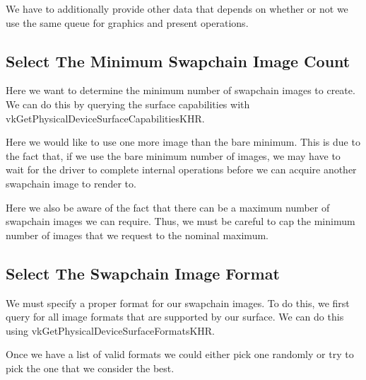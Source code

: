 We have to additionally provide other data that depends on whether or not we use
the same queue for graphics and present operations.

\begin{minipage}{\linewidth}{\noindent}
    
\end{minipage}

\subsection{Select The Minimum Swapchain Image Count}

Here we want to determine the minimum number of swapchain images to create.
We can do this by querying the surface capabilities with
vkGetPhysicalDeviceSurfaceCapabilitiesKHR.

\begin{minipage}{\linewidth}{\noindent}
    
\end{minipage}

Here we would like to use one more image than the bare minimum.
This is due to the fact that, if we use the bare minimum number of images,
we may have to wait for the driver to complete internal operations before
we can acquire another swapchain image to render to.

Here we also be aware of the fact that there can be a maximum number of
swapchain images we can require.
Thus, we must be careful to cap the minimum number of images that
we request to the nominal maximum.

\subsection{Select The Swapchain Image Format}

We must specify a proper format for our swapchain images.
To do this, we first query for all image formats that are supported by our
surface.
We can do this using vkGetPhysicalDeviceSurfaceFormatsKHR.

Once we have a list of valid formats we could either pick one randomly or
try to pick the one that we consider the best.

